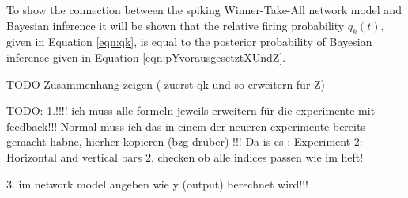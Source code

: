 To show the connection between the spiking Winner-Take-All network model and Bayesian inference it will be shown that the relative firing probability $q_k(t)$, given in Equation \ref{eqn:qk}, is equal to the posterior probability of Bayesian inference given in Equation \ref{eqn:pYvorausgesetztXUndZ}.

TODO Zusammenhang zeigen ( zuerst qk und so erweitern für Z)

TODO:
1.!!!! ich muss alle formeln jeweils erweitern für die experimente mit feedback!!! Normal muss ich das in einem der neueren experimente bereits gemacht habne, hierher kopieren (bzg drüber) 
!!! Da is es : Experiment 2: Horizontal and vertical bars
2. checken ob alle indices passen wie im heft!

3. im network model angeben wie y (output) berechnet wird!!!



